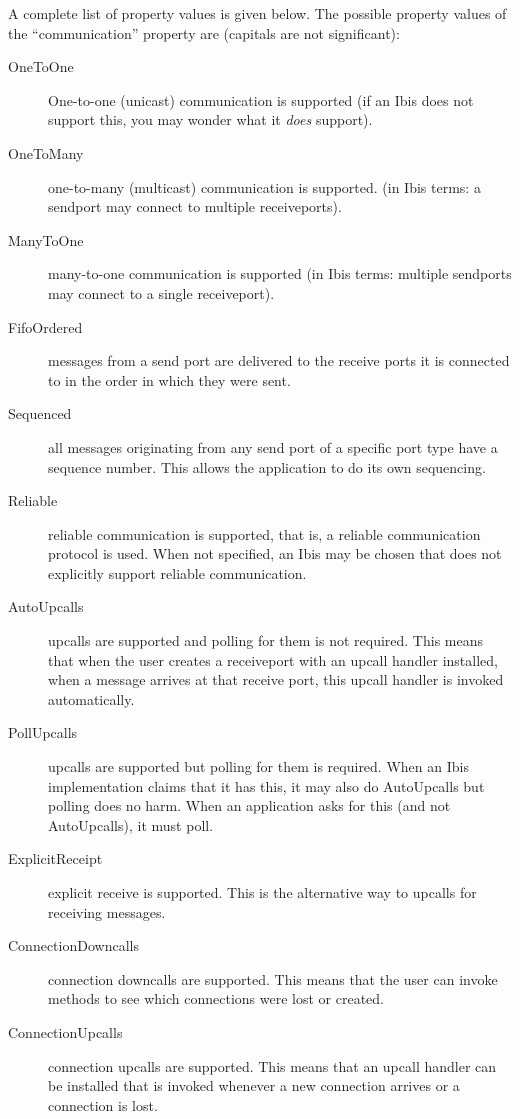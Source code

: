 \documentclass[10pt]{article}
\begin{document}
A complete list of property values is given below.
The possible property values of the ``communication'' property are
(capitals are not significant):
\begin{description}
\item[OneToOne]
One-to-one (unicast) communication is supported (if an Ibis does not support
this, you may wonder what it \emph{does} support).
\item[OneToMany]
one-to-many (multicast) communication is supported.
(in Ibis terms: a sendport
may connect to multiple receiveports).
\item[ManyToOne]
many-to-one communication is supported (in Ibis terms: multiple
sendports may connect to a single receiveport).
\item[FifoOrdered]
messages from a send port are delivered to the receive ports it is
connected to in the order in which they were sent.
\item[Sequenced]
all messages originating from any send port of a specific port type have
a sequence number. This allows the application to do its own sequencing.
\item[Reliable]
reliable communication is supported, that is,
a reliable communication protocol is used.
When not specified, an Ibis may be chosen that does not explicitly
support reliable communication.
\item[AutoUpcalls]
upcalls are supported and polling for them is not required.
This means that when the user creates a receiveport with an upcall
handler installed, when a message arrives at that receive port, 
this upcall handler is invoked automatically.
\item[PollUpcalls]
upcalls are supported but polling for them is required. When an
Ibis implementation claims that it has this, it may also do
AutoUpcalls but polling does no harm. When an application asks for
this (and not AutoUpcalls), it must poll.
\item[ExplicitReceipt]
explicit receive is supported.
This is the alternative way to upcalls for receiving messages.
\item[ConnectionDowncalls]
connection downcalls are supported. This means that the user can
invoke methods to see which connections were lost or created.
\item[ConnectionUpcalls]
connection upcalls are supported. This means that an upcall
handler can be installed that is invoked whenever a new connection arrives
or a connection is lost.
\end{description}
\end{document}
